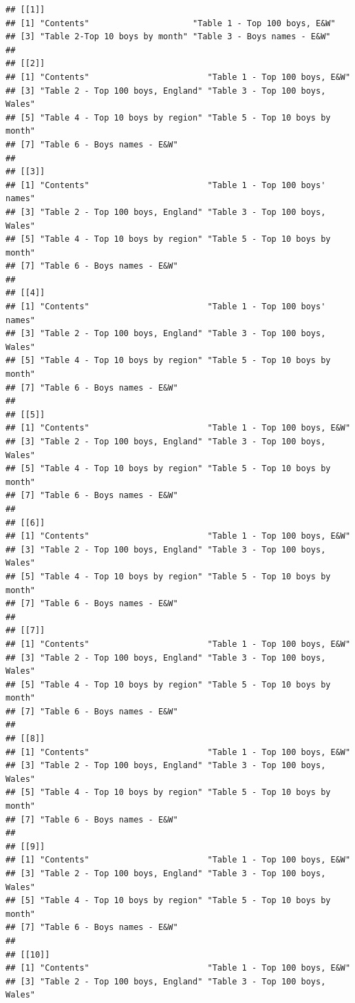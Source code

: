 \documentclass[
]{book}
\begin{document}
\begin{verbatim}
## [[1]]
## [1] "Contents"                     "Table 1 - Top 100 boys, E&W" 
## [3] "Table 2-Top 10 boys by month" "Table 3 - Boys names - E&W"  
## 
## [[2]]
## [1] "Contents"                        "Table 1 - Top 100 boys, E&W"    
## [3] "Table 2 - Top 100 boys, England" "Table 3 - Top 100 boys, Wales"  
## [5] "Table 4 - Top 10 boys by region" "Table 5 - Top 10 boys by month" 
## [7] "Table 6 - Boys names - E&W"     
## 
## [[3]]
## [1] "Contents"                        "Table 1 - Top 100 boys' names"  
## [3] "Table 2 - Top 100 boys, England" "Table 3 - Top 100 boys, Wales"  
## [5] "Table 4 - Top 10 boys by region" "Table 5 - Top 10 boys by month" 
## [7] "Table 6 - Boys names - E&W"     
## 
## [[4]]
## [1] "Contents"                        "Table 1 - Top 100 boys' names"  
## [3] "Table 2 - Top 100 boys, England" "Table 3 - Top 100 boys, Wales"  
## [5] "Table 4 - Top 10 boys by region" "Table 5 - Top 10 boys by month" 
## [7] "Table 6 - Boys names - E&W"     
## 
## [[5]]
## [1] "Contents"                        "Table 1 - Top 100 boys, E&W"    
## [3] "Table 2 - Top 100 boys, England" "Table 3 - Top 100 boys, Wales"  
## [5] "Table 4 - Top 10 boys by region" "Table 5 - Top 10 boys by month" 
## [7] "Table 6 - Boys names - E&W"     
## 
## [[6]]
## [1] "Contents"                        "Table 1 - Top 100 boys, E&W"    
## [3] "Table 2 - Top 100 boys, England" "Table 3 - Top 100 boys, Wales"  
## [5] "Table 4 - Top 10 boys by region" "Table 5 - Top 10 boys by month" 
## [7] "Table 6 - Boys names - E&W"     
## 
## [[7]]
## [1] "Contents"                        "Table 1 - Top 100 boys, E&W"    
## [3] "Table 2 - Top 100 boys, England" "Table 3 - Top 100 boys, Wales"  
## [5] "Table 4 - Top 10 boys by region" "Table 5 - Top 10 boys by month" 
## [7] "Table 6 - Boys names - E&W"     
## 
## [[8]]
## [1] "Contents"                        "Table 1 - Top 100 boys, E&W"    
## [3] "Table 2 - Top 100 boys, England" "Table 3 - Top 100 boys, Wales"  
## [5] "Table 4 - Top 10 boys by region" "Table 5 - Top 10 boys by month" 
## [7] "Table 6 - Boys names - E&W"     
## 
## [[9]]
## [1] "Contents"                        "Table 1 - Top 100 boys, E&W"    
## [3] "Table 2 - Top 100 boys, England" "Table 3 - Top 100 boys, Wales"  
## [5] "Table 4 - Top 10 boys by region" "Table 5 - Top 10 boys by month" 
## [7] "Table 6 - Boys names - E&W"     
## 
## [[10]]
## [1] "Contents"                        "Table 1 - Top 100 boys, E&W"    
## [3] "Table 2 - Top 100 boys, England" "Table 3 - Top 100 boys, Wales"  

\end{verbatim}
\end{document}
